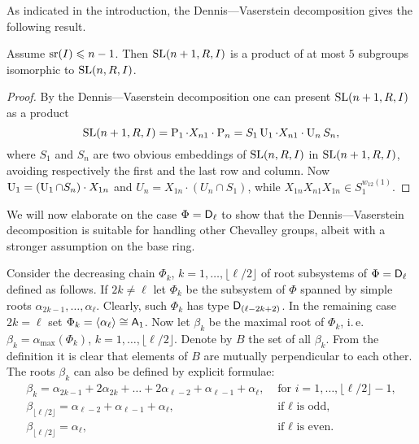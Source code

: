 As indicated in the introduction, the Dennis---Vaserstein decomposition gives the following result.
\begin{lemma}
Assume $\operatorname{sr}(I)\leqslant n-1$. Then $\operatorname{SL}(n+1,R,I)$ is a product of at most $5$ subgroups isomorphic to $\operatorname{SL}(n,R,I)$.
\end{lemma}
\begin{proof}
By the Dennis---Vaserstein decomposition one can present $\operatorname{SL}(n+1,R,I)$ as a product
\[ \operatorname{SL}(n+1,R,I) =  \operatorname{P}_1\cdot X_{n1}\cdot\operatorname{P}_n=S_1\operatorname{U}_1\cdot X_{n1}\cdot\operatorname{U}_n S_n, \]
where $S_1$ and $S_n$ are two obvious embeddings of $\operatorname{SL}(n,R,I)$ in $\operatorname{SL}(n+1,R,I)$, avoiding respectively the first and the last row and column. Now $\operatorname{U}_1=(\operatorname{U}_1\cap S_n)\cdot X_{1n}$ and $U_n= X_{1n}\cdot(U_n\cap S_1)$, while $X_{1n}X_{n1}X_{1n}\in S_1^{w_{12}(1)}$.
\end{proof}
We will now elaborate on the case $\Phi=\mathsf{D}_\ell$ to show that the Dennis---Vaserstein decomposition is suitable for handling other Chevalley groups, albeit with a stronger assumption on the base ring. 

Consider the decreasing chain $\Phi_k$, $k=1,\ldots, \lfloor \ell/2 \rfloor$ of root subsystems of $\Phi=\mathsf{D}_\ell$ defined as follows.
If $2k \neq \ell$ let $\Phi_k$ be the subsystem of $\Phi$ spanned by simple roots $\alpha_{2k-1}, \ldots, \alpha_\ell$.
Clearly, such $\Phi_k$ has type $\mathsf{D}_{(\ell-2k+2)}$. 
In the remaining case $2k = \ell$ set $\Phi_k = \langle \alpha_\ell \rangle \cong \mathsf{A}_1$.
Now let $\beta_k$ be the maximal root of $\Phi_k$, i.\,e. $\beta_k = \alpha_\mathrm{max}(\Phi_k)$, $k=1,\ldots, \lfloor \ell/2 \rfloor$.
Denote by $B$ the set of all $\beta_k$. From the definition it is clear that elements of $B$ are mutually perpendicular to each other.
The roots $\beta_k$ can also be defined by explicit formulae:
\begin{align*}
 \beta_k =  \alpha_{2k-1} + 2\alpha_{2k}+ \ldots + 2\alpha_{\ell-2} + \alpha_{\ell-1} + \alpha_\ell, & \text{ for } i=1,\ldots,\lfloor\ell/2\rfloor-1, \\
 \beta_{\lfloor\ell/2\rfloor} = \alpha_{\ell-2}+\alpha_{\ell-1}+\alpha_\ell, & \text{ if $\ell$ is odd,} \\
 \beta_{\lfloor\ell/2\rfloor} = \alpha_\ell, & \text{ if $\ell$ is even.}
\end{align*}


